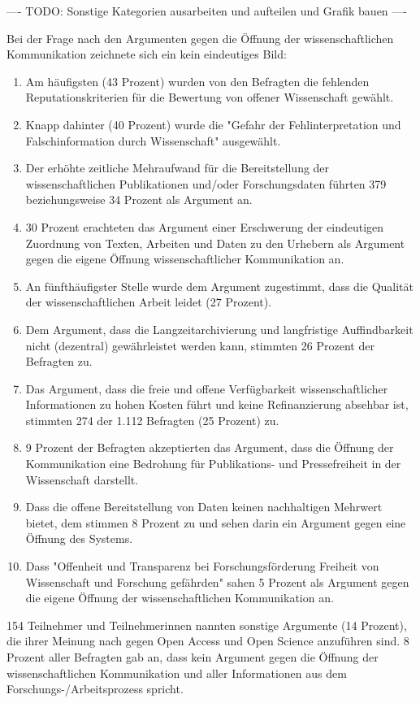 ---- TODO: Sonstige Kategorien ausarbeiten und aufteilen und Grafik bauen ----

Bei der Frage nach den Argumenten gegen die Öffnung der wissenschaftlichen Kommunikation zeichnete sich ein kein eindeutiges Bild:
\begin{enumerate}
\item Am häufigsten (43 Prozent) wurden von den Befragten die fehlenden Reputationskriterien für die Bewertung von offener Wissenschaft gewählt.
\item Knapp dahinter (40 Prozent) wurde die "Gefahr der Fehlinterpretation und Falschinformation durch Wissenschaft" ausgewählt.
\item Der erhöhte zeitliche Mehraufwand für die Bereitstellung der wissenschaftlichen Publikationen und/oder Forschungsdaten führten 379 beziehungsweise 34 Prozent als Argument an.
\item 30 Prozent erachteten das Argument einer Erschwerung der eindeutigen Zuordnung von Texten, Arbeiten und Daten zu den Urhebern als Argument gegen die eigene Öffnung wissenschaftlicher Kommunikation an.
\item  An fünfthäufigster Stelle wurde dem Argument zugestimmt, dass die Qualität der wissenschaftlichen Arbeit leidet (27 Prozent).
\item Dem Argument, dass die Langzeitarchivierung und langfristige Auffindbarkeit nicht (dezentral) gewährleistet werden kann, stimmten 26 Prozent der Befragten zu.
\item Das Argument, dass die freie und offene Verfügbarkeit wissenschaftlicher Informationen zu hohen Kosten führt und keine Refinanzierung absehbar ist, stimmten 274 der 1.112 Befragten (25 Prozent) zu.
\item 9 Prozent der Befragten akzeptierten das Argument, dass die Öffnung der Kommunikation eine Bedrohung für Publikations- und Pressefreiheit in der Wissenschaft darstellt.
\item Dass die offene Bereitstellung von Daten keinen nachhaltigen Mehrwert bietet, dem stimmen 8 Prozent zu und sehen darin ein Argument gegen eine Öffnung des Systems.
\item Dass "Offenheit und Transparenz bei Forschungsförderung Freiheit von Wissenschaft und Forschung gefährden" sahen 5 Prozent als Argument gegen die eigene Öffnung der wissenschaftlichen Kommunikation an.
\end{enumerate}

154 Teilnehmer und Teilnehmerinnen nannten sonstige Argumente (14 Prozent), die ihrer Meinung nach gegen Open Access und Open Science anzuführen sind. 8 Prozent aller Befragten gab an, dass kein Argument gegen die Öffnung der wissenschaftlichen Kommunikation und aller Informationen aus dem Forschungs-/Arbeitsprozess spricht.

